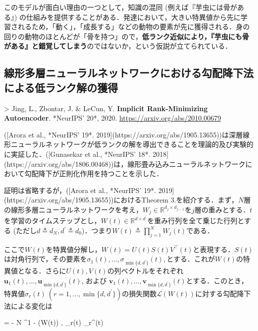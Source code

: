 このモデルが面白い理由の一つとして，知識の混同 (例えば『芋虫には骨がある』) の仕組みを提供することがある．発達において，大きい特異値から先に学習されるため，「動く」，「成長する」などの動物の要素が先に獲得される．身の回りの動物のほとんどが「骨を持つ」ので，\textbf{低ランク近似により，『芋虫にも骨がある』と錯覚してしまう}のではないか，という仮説が立てられている．
\subsection{線形多層ニューラルネットワークにおける勾配降下法による低ランク解の獲得}

> Jing, L., Zbontar, J. & LeCun, Y. \textbf{Implicit Rank-Minimizing Autoencoder}. *NeurIPS' 20*, 2020. \url{https://arxiv.org/abs/2010.00679}

([Arora et al., *NeurIPS' 19*. 2019](https://arxiv.org/abs/1905.13655))は深層線形ニューラルネットワークが低ランクの解を導出できることを理論的及び実験的に実証した．([Gunasekar et al., *NeurIPS' 18*. 2018](https://arxiv.org/abs/1806.00468))は，線形畳み込みニューラルネットワークにおいて勾配降下が正則化作用を持つことを示した．

証明は省略するが，([Arora et al., *NeurIPS' 19*. 2019](https://arxiv.org/abs/1905.13655))におけるTheorem 3.を紹介する．まず，$N$層の線形多層ニューラルネットワークを考え，$W_j \in \mathbb{R}^{d_j \times d_{j−1}}$を$j$層の重みとする．$t$を学習のタイムステップとし，$W(t) \in \mathbb{R}^{d \times d^\prime}$を重み行列を全て乗じた行列とする (ただし$d \triangleq d_N, d^\prime \triangleq d_0$)．つまり$W(t)\triangleq\prod_{j=1}^N W_j(t)$である．

ここで$W(t)$を特異値分解し，$W(t) = U(t)S(t)V^\top(t)$と表現する．$S(t)$は対角行列で，その要素を$\sigma_1(t), \ldots , \sigma_{\min\{d, d^\prime\}}(t),$とする．これが$W(t)$の特異値となる．さらに$U(t), V (t)$の列ベクトルをそれぞれ $\mathbf{u}_1(t), \ldots, \mathbf{u}_{\min\{d, d^\prime\}}(t)$, および $\mathbf{v}_1(t), \ldots, \mathbf{v}_{\min\{d,d^\prime \}}(t)$とする．このとき，特異値$ \sigma_r(t)\ (r=1, \ldots, \min\{d,d^\prime \})$の損失関数$\mathcal{L}(W(t))$に対する勾配降下法による変化は


 = - N \cdot {}^{1 - } \cdot \left\langle \nabla {}(W(t)) , _r(t) _r^\top(t) \right\rangle


